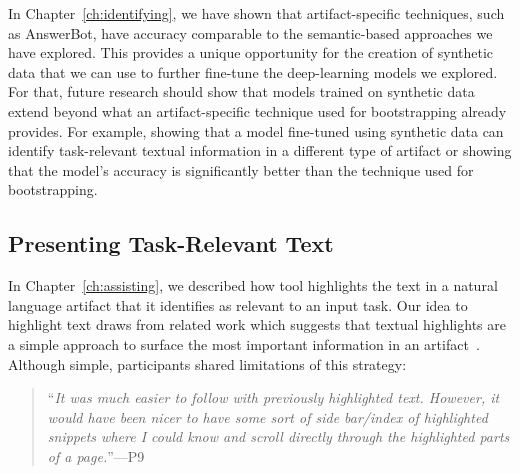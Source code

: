 In Chapter~\ref{ch:identifying}, we have shown that artifact-specific techniques, such as AnswerBot, have accuracy comparable to the semantic-based approaches
we have explored. This  provides
a unique opportunity for the creation of synthetic data that we can use to further fine-tune the deep-learning models we explored.
For that, future research should show that models trained on synthetic data
 extend beyond what an artifact-specific technique used for bootstrapping already provides. For example, showing that
a model fine-tuned using synthetic data can identify task-relevant textual information in a different type of artifact or showing
that the model's accuracy is significantly better than the technique used for bootstrapping.














\subsection{Presenting Task-Relevant Text}
\label{cp7:info-viz}




In Chapter~\ref{ch:assisting}, we described how \acs{tool}
highlights the text in a natural language artifact that it identifies 
as relevant to an input task. Our idea to highlight text 
draws from related work which suggests that textual highlights 
are a simple approach to surface the most important information in 
an artifact~\cite{Robillard2015,nadi2020}. 
Although simple, participants shared limitations of 
this strategy:



\smallskip
\begin{quote}
``\textit{It was much easier to follow with previously highlighted text.  
    However, it would have been nicer to have some sort of side bar/index of highlighted snippets
    where I could know and scroll directly through the highlighted parts of a page.}''---P9
\end{quote}



